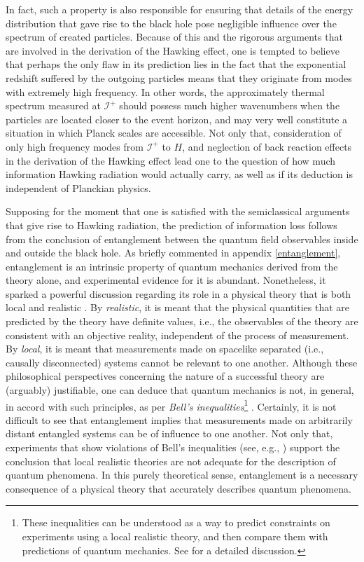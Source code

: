 \documentclass[
12pt,		%
openright,	%
twoside,  %
a4paper,			%
chapter=TITLE,		%
english,			%
french,				%
spanish,			%
brazil				%
]{USPSC-classe/USPSC}
\begin{document}
In fact, such a property is also responsible for ensuring that details of the energy distribution that gave rise to the black hole pose negligible influence over the spectrum of created particles. Because of this and the rigorous arguments that are involved in the derivation of the Hawking effect, one is tempted to believe that perhaps the only flaw in its prediction lies in the fact that the exponential redshift suffered by the outgoing particles means that they originate from modes with extremely high frequency. In other words, the approximately thermal spectrum measured at $\mathscr{I}^+$ should possess much higher wavenumbers when the particles are located closer to the event horizon, and may very well constitute a situation in which Planck scales are accessible. Not only that, consideration of only high frequency modes from $\mathscr{I}^+$ to $H$, and neglection of back reaction effects in the derivation of the Hawking effect lead one to the question of how much information Hawking radiation would actually carry, as well as if its deduction is independent of Planckian physics. 

Supposing for the moment that one is satisfied with the semiclassical arguments that give rise to Hawking radiation, the prediction of information loss follows from the conclusion of entanglement between the quantum field observables inside and outside the black hole. As briefly commented in appendix \ref{entanglement}, entanglement is an intrinsic property of quantum mechanics derived from the theory alone, and experimental evidence for it is abundant. Nonetheless, it sparked a powerful discussion regarding its role in a physical theory that is both local and realistic \cite{Einstein1935}. By \textit{realistic}, it is meant that the physical quantities that are predicted by the theory have definite values, i.e., the observables of the theory are consistent with an objective reality, independent of the process of measurement. By \textit{local}, it is meant that measurements made on spacelike separated (i.e., causally disconnected) systems cannot be relevant to one another. Although these philosophical perspectives concerning the nature of a successful theory are (arguably) justifiable, one can deduce that quantum mechanics is not, in general, in accord with such principles, as per \textit{Bell's inequalities}\footnote{These inequalities can be understood as a way to predict constraints on experiments using a local realistic theory, and then compare them with predictions of quantum mechanics. See \cite{Nielsen2010} for a detailed discussion.} \cite{Bell1964}. Certainly, it is not difficult to see that entanglement implies that measurements made on arbitrarily distant entangled systems can be of influence to one another. Not only that, experiments that show violations of Bell's inequalities (see, e.g., \cite{Aspect1981, Aspect1982}) support the conclusion that local realistic theories are not adequate for the description of quantum phenomena. In this purely theoretical sense, entanglement is a necessary consequence of a physical theory that accurately describes quantum phenomena.
\end{document}
